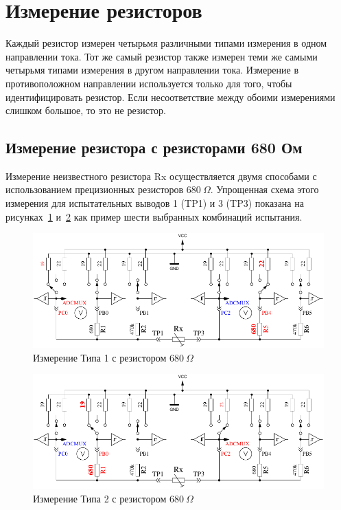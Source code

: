 \section{Измерение резисторов}
Каждый резистор измерен четырьмя различными типами измерения в одном направлении тока. Тот же самый  резистор 
также измерен теми же самыми четырьмя типами измерения в другом направлении тока. Измерение в противоположном 
направлении используется только для того, чтобы идентифицировать резистор. Если несоответствие между обоими 
измерениями слишком большое, то это не резистор.

\subsection{Измерение резистора с резисторами 680 Ом}
Измерение неизвестного резистора Rx осуществляется двумя способами с использованием прецизионных резисторов
 \(680~\Omega\). Упрощенная схема этого измерения для испытательных выводов 1 (TP1) и 3 (TP3) показана на 
рисунках~\ref{fig:RL1mes} и~\ref{fig:RL2mes} как пример шести выбранных комбинаций испытания.

\begin{figure}[H]
\centering
\includegraphics[width=.8\textwidth]{../FIG/ResistormessL1.pdf}
\caption{Измерение Типа 1 с резистором \(680~\Omega\) }
\label{fig:RL1mes}
\end{figure}

\begin{figure}[H]
 \centering
 \includegraphics[width=.8\textwidth]{../FIG/ResistormessL2.pdf}
 \caption{Измерение Типа 2 с резистором \(680~\Omega\) }
\label{fig:RL2mes}
\end{figure}



